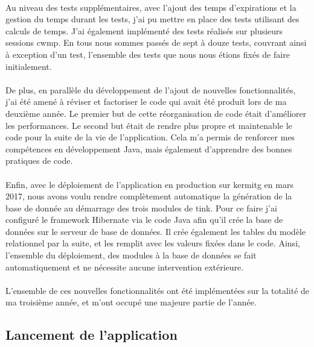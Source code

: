 \documentclass[12pt,a4paper]{report}
\begin{document}
\paragraph*{}Au niveau des tests supplémentaires, avec l'ajout des temps d'expirations et la gestion du temps durant les tests, j'ai pu mettre en place des tests utilisant des calculs de temps. J'ai également implémenté des tests réalisés sur plusieurs sessions \gls{cwmp}. En tous nous sommes passés de sept à douze tests, couvrant ainsi à exception d'un test, l'ensemble des tests que nous nous étions fixés de faire initialement.
\paragraph*{}De plus, en parallèle du développement de l'ajout de nouvelles fonctionnalités, j'ai été amené à réviser et factoriser le code qui avait été produit lors de ma deuxième année. Le premier but de cette réorganisation de code était d'améliorer les performances. Le second but était de rendre plus propre et maintenable le code pour la suite de la vie de l'application. Cela m'a permis de renforcer mes compétences en développement Java, mais également d'apprendre des bonnes pratiques de code.
\paragraph*{} Enfin, avec le déploiement de l'application en production sur \gls{kermitg} en mars 2017, nous avons voulu rendre complètement automatique la génération de la base de donnée au démarrage des trois modules de \gls{tink}. Pour ce faire j'ai configuré le framework Hibernate via le code Java afin qu'il crée la base de données sur le serveur de base de données. Il crée également les tables du modèle relationnel par la suite, et les remplit avec les valeurs fixées dans le code. Ainsi, l'ensemble du déploiement, des modules à la base de données se fait automatiquement et ne nécessite aucune intervention extérieure.
\paragraph*{} L'ensemble de ces nouvelles fonctionnalités ont été implémentées sur la totalité de ma troisième année, et m'ont occupé une majeure partie de l'année. \\

\subsection{Lancement de l'application}
\end{document}
